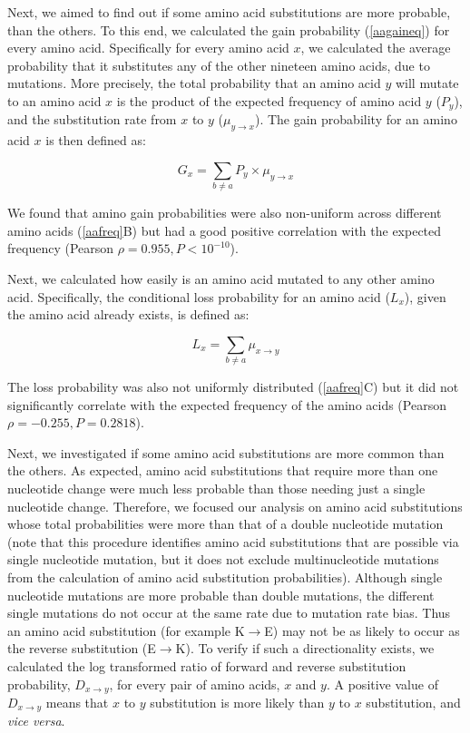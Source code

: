 \documentclass[12pt,a4paper]{article}
\begin{document}
Next, we aimed to find out if some amino acid substitutions are more probable, than the others. To this end, we calculated the gain probability (\autoref{aagaineq}) for every amino acid. Specifically for every amino acid $x$, we calculated the average probability that it substitutes any of the other nineteen amino acids, due to mutations. More precisely, the total probability that an amino acid $y$ will mutate to an amino acid $x$ is the product of the expected frequency of amino acid $y$ ($P_y$), and the substitution rate from $x$ to $y$ ($\mu_{y\to x}$). The gain probability for an amino acid $x$ is then defined as:

\begin{equation}
G_x = \sum_{b \neq a} P_y \times \mu_{y\to x}
\label{aagaineq}
\end{equation}

We found that amino gain probabilities were also non-uniform across different amino acids (\autoref{aafreq}B) but had a good positive correlation with the expected frequency (Pearson $\rho = 0.955, P<10^{-10}$).

Next, we calculated how easily is an amino acid mutated to any other amino acid. Specifically, the conditional loss probability for an amino acid ($L_x$), given the amino acid already exists, is defined as:

\begin{equation}
L_x = \sum_{b \neq a} \mu_{x\to y}
\label{aalosseq}
\end{equation}


The loss probability was also not uniformly distributed (\autoref{aafreq}C) but it did not significantly correlate with the expected frequency of the amino acids (Pearson $\rho = -0.255, P = 0.2818$).

Next, we investigated if some amino acid substitutions are more common than the others. As expected, amino acid substitutions that require more than one nucleotide change were much less probable than those needing just a single nucleotide change. Therefore, we focused our analysis on amino acid substitutions whose total probabilities were more than that of a double nucleotide mutation (note that this procedure identifies amino acid substitutions that are possible via single nucleotide mutation, but it does not exclude multinucleotide mutations from the calculation of amino acid substitution probabilities). Although single nucleotide mutations are more probable than double mutations, the different single mutations do not occur at the same rate due to mutation rate bias. Thus an amino acid substitution (for example K$\to$E) may not be as likely to occur as the reverse substitution (E$\to$K). To verify if such a directionality exists, we calculated the log transformed ratio of forward and reverse substitution probability, $D_{x\to y}$, for every pair of amino acids, $x$ and $y$. A positive value of $D_{x\to y}$ means that $x$ to $y$ substitution is more likely than $y$ to $x$ substitution, and \textit{vice versa}.
\end{document}
